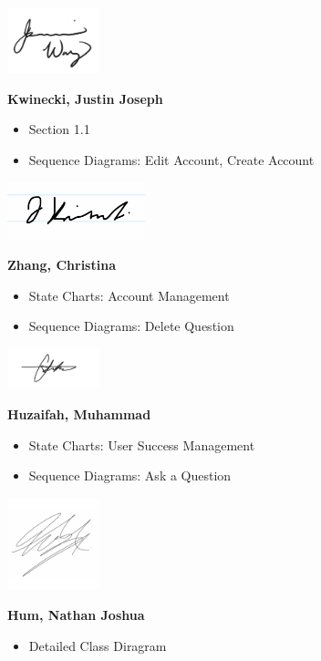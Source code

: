 \documentclass[]{article}
\numberwithin{figure}{section}
\begin{document}
\includegraphics[width=0.2\textwidth]{signatures/Jasmine_signature.jpg} %

\noindent
\textbf{Kwinecki, Justin Joseph}
\begin{itemize}
	\item Section 1.1
	\item Sequence Diagrams: Edit Account, Create Account
\end{itemize}

\includegraphics[width=0.3\textwidth]{signatures/Justin.png} %

\noindent
\textbf{Zhang, Christina}
\begin{itemize}
	\item State Charts: Account Management
	\item Sequence Diagrams: Delete Question 
\end{itemize}

\includegraphics[width=0.2\textwidth]{signatures/ChristinaSignature.png} %

\newpage
\noindent
\textbf{Huzaifah, Muhammad}
\begin{itemize}
	\item State Charts: User Success Management
	\item Sequence Diagrams: Ask a Question
\end{itemize}

\includegraphics[width=0.2\textwidth]{signatures/Muhammad_Signature.png} %

\noindent
\textbf{Hum, Nathan Joshua}
\begin{itemize}
	\item Detailed Class Diragram
\end{itemize}
\end{document}
